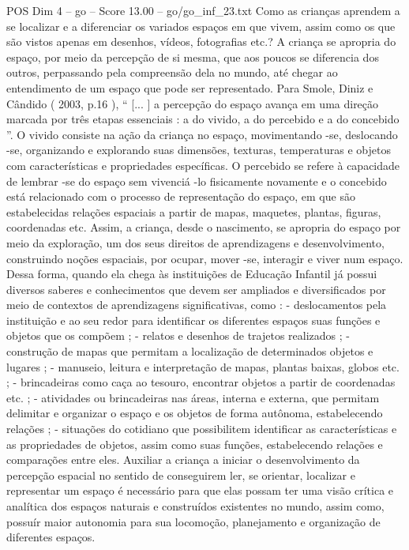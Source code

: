 \begin{textsample}{POS Dim 4 – go – Score 13.00 – go/go\_inf\_23.txt}
Como as crianças aprendem a se localizar e a diferenciar os variados espaços em que vivem, assim como os que são vistos apenas em desenhos, vídeos, fotografias etc.?
A criança se apropria do espaço, por meio da percepção de si mesma, que aos poucos se diferencia dos outros, perpassando pela compreensão dela no mundo, até chegar ao entendimento de um espaço que pode ser representado.
Para Smole, Diniz e Cândido ( 2003, p.16 ), “ [... ] a percepção do espaço avança em uma direção marcada por três etapas essenciais : a do vivido, a do percebido e a do concebido ”.
O vivido consiste na ação da criança no espaço, movimentando -se, deslocando -se, organizando e explorando suas dimensões, texturas, temperaturas e objetos com características e propriedades específicas.
O percebido se refere à capacidade de lembrar -se do espaço sem vivenciá -lo fisicamente novamente e o concebido está relacionado com o processo de representação do espaço, em que são estabelecidas relações espaciais a partir de mapas, maquetes, plantas, figuras, coordenadas etc.
Assim, a criança, desde o nascimento, se apropria do espaço por meio da exploração, um dos seus direitos de aprendizagens e desenvolvimento, construindo noções espaciais, por ocupar, mover -se, interagir e viver num espaço.
Dessa forma, quando ela chega às instituições de Educação Infantil já possui diversos saberes e conhecimentos que devem ser ampliados e diversificados por meio de contextos de aprendizagens significativas, como : - deslocamentos pela instituição e ao seu redor para identificar os diferentes espaços suas funções e objetos que os compõem ; - relatos e desenhos de trajetos realizados ; - construção de mapas que permitam a localização de determinados objetos e lugares ; - manuseio, leitura e interpretação de mapas, plantas baixas, globos etc. ; - brincadeiras como caça ao tesouro, encontrar objetos a partir de coordenadas etc. ; - atividades ou brincadeiras nas áreas, interna e externa, que permitam delimitar e organizar o espaço e os objetos de forma autônoma, estabelecendo relações ; - situações do cotidiano que possibilitem identificar as características e as propriedades de objetos, assim como suas funções, estabelecendo relações e comparações entre eles.
Auxiliar a criança a iniciar o desenvolvimento da percepção espacial no sentido de conseguirem ler, se orientar, localizar e representar um espaço é necessário para que elas possam ter uma visão crítica e analítica dos espaços naturais e construídos existentes no mundo, assim como, possuír maior autonomia para sua locomoção, planejamento e organização de diferentes espaços.

\end{textsample}

